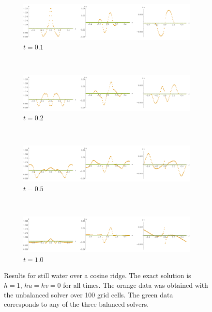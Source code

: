 \begin{figure}
  \centering
  \begin{subfigure}{\textwidth}
    \includegraphics[width=\textwidth]{diagrams/results-still-1}
    \caption{$t = 0.1$}
    \label{fig:results-still-1}
  \end{subfigure} \\
  \begin{subfigure}{\textwidth}
    \includegraphics[width=\textwidth]{diagrams/results-still-2}
    \caption{$t = 0.2$}
    \label{fig:results-still-2}
  \end{subfigure} \\
  \begin{subfigure}{\textwidth}
    \includegraphics[width=\textwidth]{diagrams/results-still-5}
    \caption{$t = 0.5$}
    \label{fig:results-still-5}
  \end{subfigure} \\
  \begin{subfigure}{\textwidth}
    \includegraphics[width=\textwidth]{diagrams/results-still-10}
    \caption{$t = 1.0$}
    \label{fig:results-still-10}
  \end{subfigure}
  \caption{Results for still water over a cosine ridge. The exact solution is $h = 1$, $hu = hv = 0$ for all times. The orange data was obtained with the unbalanced solver over 100 grid cells.  The green data corresponds to any of the three balanced solvers.}
  \label{fig:results-still}
\end{figure}

